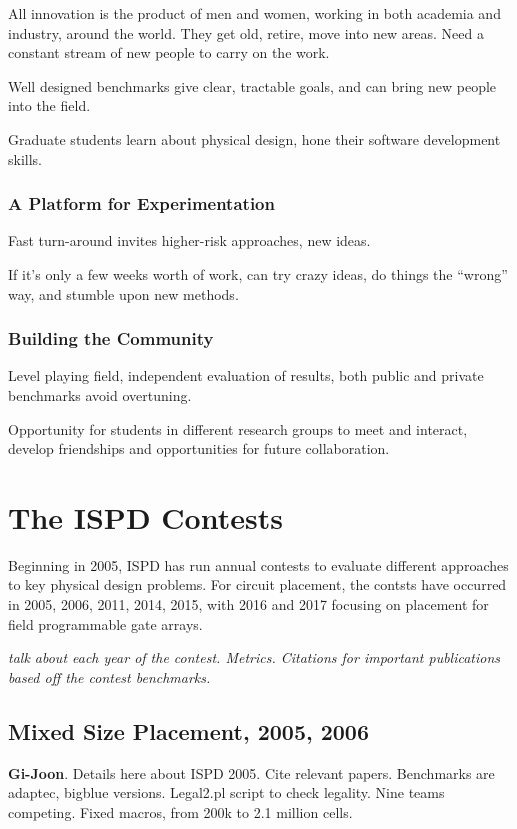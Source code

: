 \documentclass[sigconf]{acmart}
\begin{document}
All innovation is the product of men and women, working in both
academia and industry, around the world.  They get old, retire,
move into new areas.  Need a constant stream of new people to
carry on the work.

Well designed benchmarks give clear, tractable goals, and can
bring new people into the field.

Graduate students learn about physical design, hone their software
development skills.


\subsubsection{A Platform for Experimentation}

Fast turn-around invites higher-risk approaches, new ideas.

If it's only a few weeks worth of work, can try crazy
ideas, do things the ``wrong'' way, and stumble upon new
methods.

\subsubsection{Building the Community}

Level playing field, independent evaluation of results,
both public and private benchmarks avoid overtuning.

Opportunity for students in different research groups
to meet and interact, develop friendships and opportunities
for future collaboration.



\section{The ISPD Contests}

Beginning in 2005, ISPD has run annual contests to evaluate
different approaches to key physical design problems.  For circuit
placement, the contsts have occurred in 2005, 2006, 2011, 2014,
2015, with 2016 and 2017 focusing on placement for
field programmable gate arrays.

{\em talk about each year of the contest.  Metrics.  Citations
  for important publications based off the contest benchmarks.}

\subsection{Mixed Size Placement, 2005, 2006}

{\bf Gi-Joon}.  
\cite{ISPD05_contest}
Details here about ISPD 2005.  Cite relevant papers.
Benchmarks are adaptec, bigblue versions.  Legal2.pl script to
check legality.  Nine teams competing.
Fixed macros, from 200k to 2.1 million cells.
\end{document}

